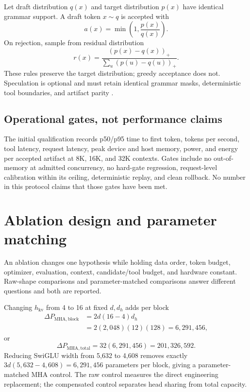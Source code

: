 \documentclass[10pt,letterpaper]{article}
\newcommand{\1}{\mathbb{1}}
\begin{document}
Let draft distribution $q(x)$ and target distribution $p(x)$ have identical grammar support.  A draft
token $x\sim q$ is accepted with
\begin{equation}
  a(x)=\min\!\left(1,\frac{p(x)}{q(x)}\right).
  \label{eq:spec-accept}
\end{equation}
On rejection, sample from residual distribution
\begin{equation}
  r(x)=\frac{(p(x)-q(x))_+}{\sum_u(p(u)-q(u))_+}.
  \label{eq:spec-residual}
\end{equation}
These rules preserve the target distribution; greedy acceptance does not.  Speculation is optional
and must retain identical grammar masks, deterministic tool boundaries, and artifact parity
\cite{leviathan2023speculative}.

\subsection{Operational gates, not performance claims}

The initial qualification records p50/p95 time to first token, tokens per second, tool latency,
request latency, peak device and host memory, power, and energy per accepted artifact at 8K, 16K, and
32K contexts.  Gates include no out-of-memory at admitted concurrency, no hard-gate regression,
request-level calibration within its ceiling, deterministic replay, and clean rollback.  No number in
this protocol claims that those gates have been met.

\section{Ablation design and parameter matching}

An ablation changes one hypothesis while holding data order, token budget, optimizer, evaluation,
context, candidate/tool budget, and hardware constant.  Raw-shape comparisons and parameter-matched
comparisons answer different questions and both are reported.

Changing $h_{\mathrm{kv}}$ from 4 to 16 at fixed $d,d_h$ adds per block
\begin{align}
  \Delta P_{\mathrm{MHA,block}}
  &=2d(16-4)d_h\\
  &=2(2{,}048)(12)(128)=6{,}291{,}456,
\end{align}
or
\begin{equation}
  \Delta P_{\mathrm{MHA,total}}=32(6{,}291{,}456)=201{,}326{,}592.
  \label{eq:mha-extra}
\end{equation}
Reducing SwiGLU width from 5,632 to 4,608 removes exactly
$3d(5{,}632-4{,}608)=6{,}291{,}456$ parameters per block, giving a parameter-matched MHA control.
The raw control measures the direct engineering replacement; the compensated control separates head
sharing from total capacity.
\end{document}
